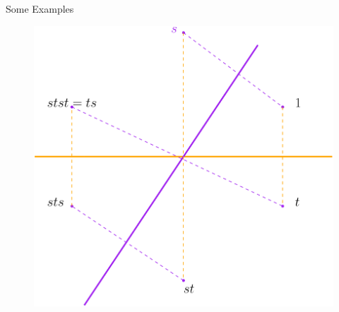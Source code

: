 \documentclass[aspectratio=169,xcolor=dvipsnames]{beamer}
\begin{document}
\begin{frame}{Some Examples}
    \begin{figure}
        \centering
        \includegraphics[width=0.5\linewidth]{frameN.png}
        \label{fig:enter-label}
    \end{figure}
    
\end{frame}
\end{document}
